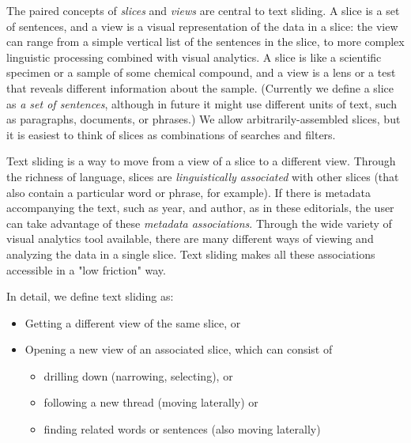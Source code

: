 \documentclass{sig-alternate}
\begin{document}
The paired concepts of \emph{slices} and \emph{views} are central to text sliding. A slice is a set of sentences, and a view is a visual representation of the data in a slice: the view can range from a simple vertical list of the sentences in the slice, to more complex linguistic processing combined with visual analytics.  A slice is like a scientific specimen or a sample of some chemical compound,  and a view is a lens or a test that reveals different information about the sample.
(Currently we define a slice as \emph{a set of sentences}, although in future it might use different units of text, such as paragraphs, documents, or phrases.) We allow arbitrarily-assembled slices, but it is easiest to think of slices as combinations of searches and filters.  


Text sliding is a way to move from a view of a slice to a different view. Through the richness of language, slices are \emph{linguistically associated} with other slices (that also contain a particular word or phrase, for example). If there is metadata accompanying the text, such as year, and author, as in these editorials, the user can take advantage of these  \emph{metadata associations}.  Through the wide variety of visual analytics tool available, there are many different ways of viewing and analyzing the data in a single slice. Text sliding makes all these associations accessible in a "low friction" way.

In detail, we define text sliding as:
\begin{itemize}
	\item Getting a different view of the same slice, or
	\item Opening a new view of an associated slice, which can consist of
	\begin{itemize}
	  \item drilling down (narrowing, selecting), or
	  \item following a new thread (moving laterally) or
	  \item finding related words or sentences  (also moving laterally)
	 \end{itemize}
\end{itemize}
\end{document}
